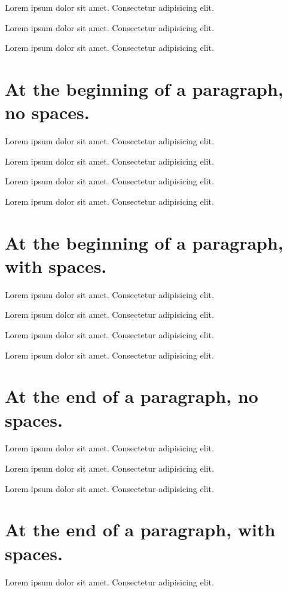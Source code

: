 \documentclass[12pt]{article}
\begin{document}
Lorem ipsum dolor  sit amet.  Consectetur adipisicing elit.

Lorem ipsum dolor  sit amet.  Consectetur adipisicing elit.

Lorem ipsum dolor   sit amet.  Consectetur adipisicing elit.

\section*{At the beginning of a paragraph, no spaces.}

Lorem ipsum dolor sit amet.  Consectetur adipisicing elit.

Lorem ipsum dolor sit amet.  Consectetur adipisicing elit.

Lorem ipsum dolor sit amet.  Consectetur adipisicing elit.

 Lorem ipsum dolor sit amet.  Consectetur adipisicing elit.

\section*{At the beginning of a paragraph, with spaces.}

Lorem ipsum dolor sit amet.  Consectetur adipisicing elit.

 Lorem ipsum dolor sit amet.  Consectetur adipisicing elit.

 Lorem ipsum dolor sit amet.  Consectetur adipisicing elit.

  Lorem ipsum dolor sit amet.  Consectetur adipisicing elit.

\section*{At the end of a paragraph, no spaces.}

Lorem ipsum dolor sit amet.  Consectetur adipisicing elit.

Lorem ipsum dolor sit amet.  Consectetur adipisicing elit.

Lorem ipsum dolor sit amet.  Consectetur adipisicing elit. 

\section*{At the end of a paragraph, with spaces.}

Lorem ipsum dolor sit amet.  Consectetur adipisicing elit.
\end{document}
